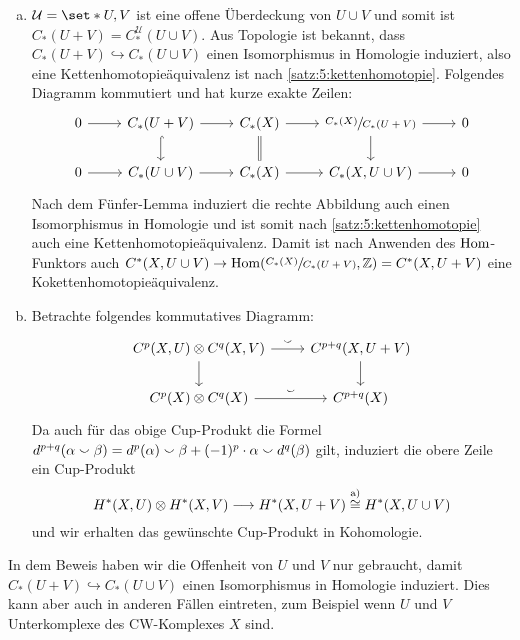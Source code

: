 \begin{beweis}
	\leavevmode
	\begin{enumerate}[(a)]
		\item $\mathcal{U}=\set*{U,V}$ ist eine offene Überdeckung von $U \cup V$ und somit ist $C_*(U+V)=C_*^{\mathcal{U}}(U\cup V)$.
		Aus Topologie  ist bekannt, dass $C_*(U + V) \hookrightarrow C_*(U \cup V)$ einen Isomorphismus in Homologie induziert, also eine Kettenhomotopieäquivalenz ist nach \autoref{satz:5:kettenhomotopie}.
		Folgendes Diagramm kommutiert und hat kurze exakte Zeilen:
		\[
			\begin{tikzcd}
				0 \rar & C_*(U+V)\dar[hook] \rar & C_*(X) \dar[equal] \rar & \sfrac{C_*(X)}{C_*(U +V)} \dar \rar & 0 \\
				0 \rar & C_*(U \cup V) \rar & C_*(X) \rar & C_*(X, U \cup V) \rar & 0
			\end{tikzcd}
		\]
		Nach dem Fünfer-Lemma induziert die rechte Abbildung auch einen Isomorphismus in Homologie und ist somit nach \autoref{satz:5:kettenhomotopie} auch eine Kettenhomotopieäquivalenz.
		Damit ist nach Anwenden des $\operatorname{Hom}$-Funktors auch $C^*(X, U \cup V) \to \Hom \enbrace*{\sfrac{C_*(X)}{C_*(U +V)}, \mathbb{Z}} = C^*(X, U + V)$ eine Kokettenhomotopieäquivalenz.
		\item Betrachte folgendes kommutatives Diagramm:
		\[
			\begin{tikzcd}
				C^p(X,U) \otimes C^q(X,V) \dar \rar["\cupp"] & C^{p+q}(X,U+V) \dar \\
				C^p(X) \otimes C^q(X) \rar["\cupp"] & C^{p+q}(X) 
			\end{tikzcd}
		\]
		Da auch für das obige Cup-Produkt die Formel $d^{p+q}(\alpha \smallsmile \beta) = d^p(\alpha) \smallsmile \beta + (-1)^p \cdot \alpha \smallsmile d^q(\beta)$ gilt, induziert die obere Zeile ein Cup-Produkt
		\[
			H^*(X,U) \otimes H^*(X,V) \longrightarrow H^*(X, U+ V) \stackrel{\mbox{\scriptsize a)}}{\cong} H^*(X, U \cup V)
		\]
		und wir erhalten das gewünschte Cup-Produkt in Kohomologie. \qedhere
	\end{enumerate}
\end{beweis}
In dem Beweis haben wir die Offenheit von $U$ und $V$ nur gebraucht, damit $C_*(U + V) \hookrightarrow C_*(U \cup V)$ einen Isomorphismus in Homologie induziert.
Dies kann aber auch in anderen Fällen eintreten, zum Beispiel wenn $U$ und $V$ Unterkomplexe des CW-Komplexes $X$ sind.


